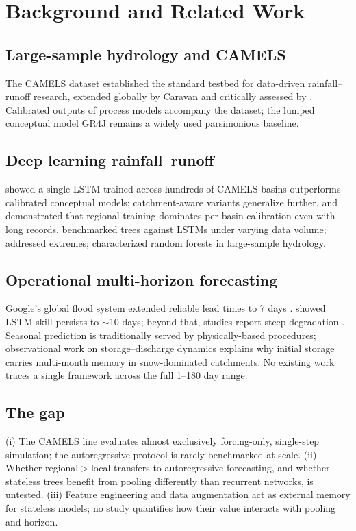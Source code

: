 \documentclass[11pt]{article}
\begin{document}
\section{Background and Related Work}
\subsection{Large-sample hydrology and CAMELS}
The CAMELS dataset \citep{newman2015} established the standard testbed for
data-driven rainfall--runoff research, extended globally by Caravan
\citep{kratzert2023} and critically assessed by \citet{clerc2024}. Calibrated
outputs of process models accompany the dataset; the lumped conceptual model
GR4J \citep{perrin2003} remains a widely used parsimonious baseline.

\subsection{Deep learning rainfall--runoff}
\citet{kratzert2018} showed a single LSTM trained across hundreds of CAMELS
basins outperforms calibrated conceptual models; catchment-aware variants
\citep{kratzert2019} generalize further, and \citet{kratzert2024} demonstrated
that regional training dominates per-basin calibration even with long records.
\citet{gauch2021} benchmarked trees against LSTMs under varying data volume;
\citet{frame2022} addressed extremes; \citet{schoppa2020} characterized random
forests in large-sample hydrology.

\subsection{Operational multi-horizon forecasting}
Google's global flood system extended reliable lead times to 7 days
\citep{nearing2024}. \citet{hunt2022} showed LSTM skill persists to
$\sim$10 days; beyond that, studies report steep degradation \citep{li2023,
islam2025}. Seasonal prediction is traditionally served by physically-based
procedures; observational work on storage--discharge dynamics
\citep{kirchner2009} explains why initial storage carries multi-month memory
in snow-dominated catchments. No existing work traces a single framework
across the full 1--180 day range.

\subsection{The gap}
(i) The CAMELS line evaluates almost exclusively forcing-only, single-step
simulation; the autoregressive protocol is rarely benchmarked at scale.
(ii) Whether regional$>$local transfers to autoregressive forecasting, and
whether stateless trees benefit from pooling differently than recurrent
networks, is untested. (iii) Feature engineering and data augmentation act as
external memory for stateless models; no study quantifies how their value
interacts with pooling and horizon.
\end{document}
